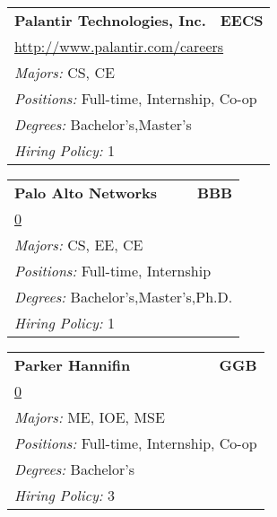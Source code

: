 \documentclass[twoside]{article}
\begin{document}
\begin{center}
\begin{multicols}{3}
\begin{FlushLeft}
\begin{minipage}{\columnwidth}\begin{tabularx}{.95\columnwidth}{Xr}
                 {\Large\bf Palantir Technologies, Inc.} & {\Large\bf EECS}\\
    \multicolumn{2}{p{.95\columnwidth}}{\url{http://www.palantir.com/careers}}\\
    \multicolumn{2}{p{.95\columnwidth}}{\emph{Majors:} CS, CE}\\
    \multicolumn{2}{p{.95\columnwidth}}{\emph{Positions:} Full-time, Internship, Co-op}\\
    \multicolumn{2}{p{.95\columnwidth}}{\emph{Degrees:} Bachelor's,Master's}\\
    \multicolumn{2}{p{.95\columnwidth}}{\emph{Hiring Policy:} 1}\\
    \end{tabularx}
    
\end{minipage}
 
\begin{minipage}{\columnwidth}\begin{tabularx}{.95\columnwidth}{Xr}
                 {\Large\bf Palo Alto Networks} & {\Large\bf BBB}\\
    \multicolumn{2}{p{.95\columnwidth}}{\url{0}}\\
    \multicolumn{2}{p{.95\columnwidth}}{\emph{Majors:} CS, EE, CE}\\
    \multicolumn{2}{p{.95\columnwidth}}{\emph{Positions:} Full-time, Internship}\\
    \multicolumn{2}{p{.95\columnwidth}}{\emph{Degrees:} Bachelor's,Master's,Ph.D.}\\
    \multicolumn{2}{p{.95\columnwidth}}{\emph{Hiring Policy:} 1}\\
    \end{tabularx}
    
\end{minipage}
 
\begin{minipage}{\columnwidth}\begin{tabularx}{.95\columnwidth}{Xr}
                 {\Large\bf Parker Hannifin} & {\Large\bf GGB}\\
    \multicolumn{2}{p{.95\columnwidth}}{\url{0}}\\
    \multicolumn{2}{p{.95\columnwidth}}{\emph{Majors:} ME, IOE, MSE}\\
    \multicolumn{2}{p{.95\columnwidth}}{\emph{Positions:} Full-time, Internship, Co-op}\\
    \multicolumn{2}{p{.95\columnwidth}}{\emph{Degrees:} Bachelor's}\\
    \multicolumn{2}{p{.95\columnwidth}}{\emph{Hiring Policy:} 3}\\
    \end{tabularx}
    

\end{minipage}
\end{FlushLeft}
\end{multicols}
\end{center}
\end{document}
